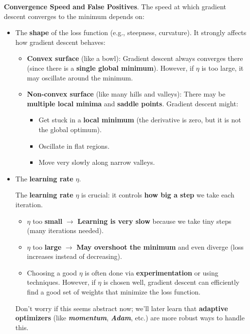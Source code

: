 \highspace
\textcolor{Green3}{\faIcon{\speedIcon} \textbf{Convergence Speed}} \textbf{and} \textcolor{Red2}{ \textbf{False Positives}}. The speed at which gradient descent converges to the minimum depends on:
\begin{itemize}
    \item The \textbf{shape} of the loss function (e.g., steepness, curvature). It strongly affects how gradient descent behaves:
    \begin{itemize}
        \item \textbf{Convex surface} (like a bowl): Gradient descent always converges there (since there is a \textbf{single global minimum}). However, if $\eta$ is too large, it may oscillate around the minimum.

        \item \textbf{Non-convex surface} (like many hills and valleys): There may be \textbf{multiple local minima} and \textbf{saddle points}. Gradient descent might: 
        \begin{itemize}
            \item[\textcolor{Red2}{\faIcon{exclamation-triangle}}] Get stuck in a \textbf{local minimum} (the derivative is zero, but it is not the global optimum).
            \item Oscillate in flat regions.
            \item Move very slowly along narrow valleys.
        \end{itemize}
    \end{itemize}


    \item The \textbf{learning rate} $\eta$.

    \textcolor{Green3}{} The \textbf{learning rate} $\eta$ is crucial: it controls \textbf{how big a step} we take each iteration.
    \begin{itemize}
        \item $\eta$ too \textbf{small} $\rightarrow$ \textbf{Learning is very slow} because we take tiny steps (many iterations needed).
        \item $\eta$ too \textbf{large} $\rightarrow$ \textbf{May overshoot the minimum} and even diverge (loss increases instead of decreasing).
        \item Choosing a good $\eta$ is often done via \textbf{experimentation} or using techniques. However, if $\eta$ is chosen well, gradient descent can efficiently find a good set of weights that minimize the loss function.
    \end{itemize}
    Don't worry if this seems abstract now; we'll later learn that \textbf{adaptive optimizers} (like \emph{\textbf{momentum}}, \emph{\textbf{Adam}}, etc.) are more robust ways to handle this.



\end{itemize}
